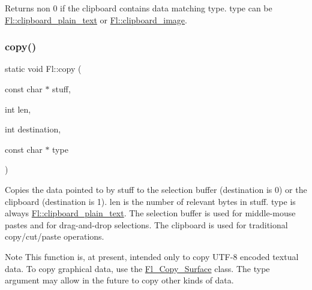 Returns non 0 if the clipboard contains data matching {\ttfamily type}. {\ttfamily type} can be \hyperlink{group__fl__clipboard_gae43ed653c1d222930510ad8042b55536}{Fl\+::clipboard\+\_\+plain\+\_\+text} or \hyperlink{group__fl__clipboard_gae37fa003534c8cc9a84b66a7040ddfcb}{Fl\+::clipboard\+\_\+image}. \mbox{\label{group__fl__clipboard_ga422fcf99f175df5b81cbe78966a21326}} 
\subsubsection{\texorpdfstring{copy()}{copy()}\hspace{0.1cm}{\footnotesize\ttfamily [1/2]}}
{\footnotesize\ttfamily static void Fl\+::copy (\begin{DoxyParamCaption}\item[{const char $\ast$}]{stuff,  }\item[{int}]{len,  }\item[{int}]{destination,  }\item[{const char $\ast$}]{type }\end{DoxyParamCaption})\hspace{0.3cm}{\ttfamily [static]}}

Copies the data pointed to by {\ttfamily stuff} to the selection buffer ({\ttfamily destination} is 0) or the clipboard ({\ttfamily destination} is 1). {\ttfamily len} is the number of relevant bytes in {\ttfamily stuff}. {\ttfamily type} is always \hyperlink{group__fl__clipboard_gae43ed653c1d222930510ad8042b55536}{Fl\+::clipboard\+\_\+plain\+\_\+text}. The selection buffer is used for middle-\/mouse pastes and for drag-\/and-\/drop selections. The clipboard is used for traditional copy/cut/paste operations.

\begin{DoxyNote}{Note}
This function is, at present, intended only to copy U\+T\+F-\/8 encoded textual data. To copy graphical data, use the \hyperlink{class_fl___copy___surface}{Fl\+\_\+\+Copy\+\_\+\+Surface} class. The {\ttfamily type} argument may allow in the future to copy other kinds of data. 
\end{DoxyNote}
\mbox{\label{group__fl__clipboard_gabfc831afe7c4de04c906f82830f54211}} 
